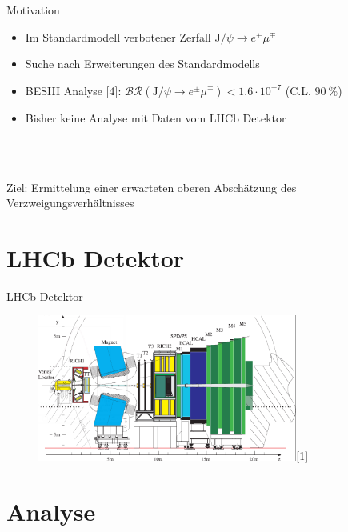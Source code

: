 \begin{frame}[t]{Motivation}
  \begin{itemize}
    \item Im Standardmodell verbotener Zerfall $\text{J}/\psi\rightarrow e^{\pm}\mu^{\mp}$
    \item Suche nach Erweiterungen des Standardmodells
    \item BESIII Analyse [4]: $\mathcal{BR}(\text{J}/\psi\rightarrow e^{\pm}\mu^{\mp})<1.6\cdot 10^{-7}$ (C.L. $\SI{90}{\percent}$)
    \item Bisher keine Analyse mit Daten vom LHCb Detektor
  \end{itemize}
  \ \\
  \ \\
  \begin{framed}
    \centering
    \large{Ziel: Ermittelung einer erwarteten oberen Abschätzung des Verzweigungsverhältnisses}
  \end{framed}
\end{frame}

\section{LHCb Detektor}
\begin{frame}[t]{LHCb Detektor}
  \begin{figure}
    \centering
    \includegraphics[width=0.76\textwidth]{Detektor.png}[1]
  \end{figure}
\end{frame}

\section{Analyse}

